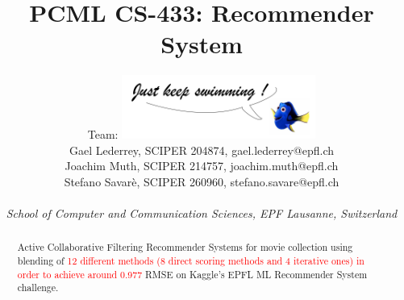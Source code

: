 \documentclass[10pt,conference,compsocconf]{IEEEtran}
\begin{document}

\title{PCML CS-433: Recommender System}

\author{
   \hspace{0.8cm} Team: {\includegraphics[width=2.5in ,valign=t, trim=0cm 0 0 3.8cm]{img/Dory.png}} \\

  Gael Lederrey, SCIPER 204874, gael.lederrey@epfl.ch \\
    Joachim Muth, SCIPER 214757, joachim.muth@epfl.ch\\
  Stefano Savar\`e, SCIPER 260960, stefano.savare@epfl.ch \\
 \\ 

  \textit{School of Computer and Communication Sciences, EPF Lausanne, Switzerland}
}

\maketitle

\begin{abstract}
Active Collaborative Filtering Recommender Systems for movie collection using blending of \textcolor{red}{12 different methods (8 direct scoring methods and 4 iterative ones) in order to achieve around 0.977} RMSE on Kaggle's EPFL ML Recommender System challenge. 
\end{abstract}
\end{document}

